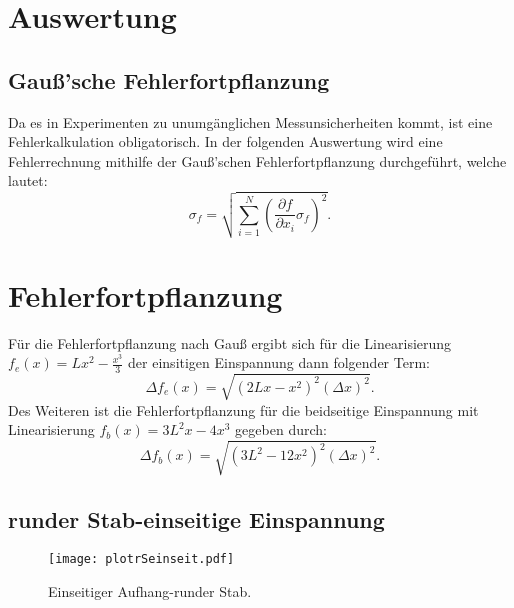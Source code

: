 \section{Auswertung}
\label{sec:Auswertung}

\subsection{Gauß'sche Fehlerfortpflanzung}
Da es in Experimenten zu unumgänglichen Messunsicherheiten kommt, ist eine 
Fehlerkalkulation obligatorisch. In der folgenden Auswertung wird eine 
Fehlerrechnung mithilfe der Gauß'schen Fehlerfortpflanzung durchgeführt, welche
lautet:
\begin{equation}
    \sigma_f = \sqrt{\sum\limits_{i=1}^N \left( \frac{\partial f}{\partial x_i} \sigma_f \right) ^2}.
\end{equation}

\section{Fehlerfortpflanzung}
Für die Fehlerfortpflanzung nach Gauß ergibt sich für die Linearisierung
$f_e(x)=Lx^2-\frac{x^3}{3}$ der einsitigen Einspannung dann folgender Term:
\begin{equation}
  \Delta f_e(x) = \sqrt{(2Lx-x^2)^2 (\Delta x)^2}.
\end{equation}
Des Weiteren ist die Fehlerfortpflanzung für die beidseitige Einspannung 
mit Linearisierung $f_b(x)=3L^2x-4x^3$ gegeben durch:
\begin{equation}
  \Delta f_b(x) = \sqrt{(3L^2-12x^2)^2 (\Delta x)^2}.
\end{equation}

\subsection{runder Stab-einseitige Einspannung}
\begin{figure}
  \centering
  \texttt{[image: plotrSeinseit.pdf]}
  \caption{Einseitiger Aufhang-runder Stab.}
  \label{fig:plotrSeinseit}
\end{figure}

